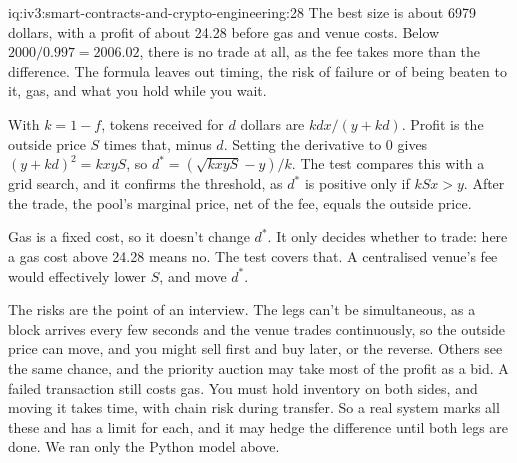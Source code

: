 \begin{solution}{iq:iv3:smart-contracts-and-crypto-engineering:28}
The best size is about 6979 dollars, with a profit of about 24.28 before gas and venue costs. Below $2000 / 0.997 = 2006.02$, there is no trade at all, as the fee takes more than the difference. The formula leaves out timing, the risk of failure or of being beaten to it, gas, and what you hold while you wait.
\enlargethispage{-2\baselineskip}%
\label{lst:iv3:cr:arb}

With $k = 1 - f$, tokens received for $d$ dollars are $k d x / (y + k d)$. Profit is the outside price $S$ times that, minus $d$. Setting the derivative to 0 gives $(y + k d)^2 = k x y S$, so $d^* = (\sqrt{k x y S} - y) / k$. The test compares this with a grid search, and it confirms the threshold, as $d^*$ is positive only if $k S x > y$. After the trade, the pool's marginal price, net of the fee, equals the outside price.

Gas is a fixed cost, so it doesn't change $d^*$. It only decides whether to trade: here a gas cost above 24.28 means no. The test covers that. A centralised venue's fee would effectively lower $S$, and move $d^*$.

The risks are the point of an interview. The legs can't be simultaneous, as a block arrives every few seconds and the venue trades continuously, so the outside price can move, and you might sell first and buy later, or the reverse. Others see the same chance, and the priority auction may take most of the profit as a bid. A failed transaction still costs gas. You must hold inventory on both sides, and moving it takes time, with chain risk during transfer. So a real system marks all these and has a limit for each, and it may hedge the difference until both legs are done. We ran only the Python model above.

\end{solution}

